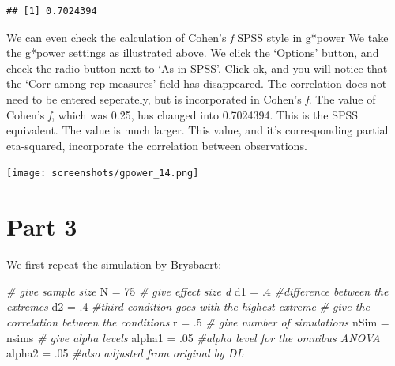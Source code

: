 \documentclass[
]{book}
\newenvironment{Shaded}{\begin{snugshade}}{\end{snugshade}}
\newcommand{\CommentTok}[1]{\textcolor[rgb]{0.56,0.35,0.01}{\textit{#1}}}
\newcommand{\DecValTok}[1]{\textcolor[rgb]{0.00,0.00,0.81}{#1}}
\newcommand{\NormalTok}[1]{#1}
\newcommand{\OtherTok}[1]{\textcolor[rgb]{0.56,0.35,0.01}{#1}}
\begin{document}
\begin{verbatim}
## [1] 0.7024394
\end{verbatim}

\newpage

We can even check the calculation of Cohen's \emph{f} SPSS style in g*power We take the g*power settings as illustrated above. We click the `Options' button, and check the radio button next to `As in SPSS'. Click ok, and you will notice that the `Corr among rep measures' field has disappeared. The correlation does not need to be entered seperately, but is incorporated in Cohen's \emph{f}. The value of Cohen's \emph{f}, which was 0.25, has changed into 0.7024394. This is the SPSS equivalent. The value is much larger. This value, and it's corresponding partial eta-squared, incorporate the correlation between observations.

\texttt{[image: screenshots/gpower\_14.png]}

\newpage

\hypertarget{part-3}{%
\section{Part 3}\label{part-3}}

We first repeat the simulation by Brysbaert:

\begin{Shaded}
\begin{Highlighting}[]
\CommentTok{\# give sample size}
\NormalTok{N }\OtherTok{=} \DecValTok{75}
\CommentTok{\# give effect size d}
\NormalTok{d1 }\OtherTok{=}\NormalTok{ .}\DecValTok{4} \CommentTok{\#difference between the extremes}
\NormalTok{d2 }\OtherTok{=}\NormalTok{ .}\DecValTok{4} \CommentTok{\#third condition goes with the highest extreme}
\CommentTok{\# give the correlation between the conditions}
\NormalTok{r }\OtherTok{=}\NormalTok{ .}\DecValTok{5}
\CommentTok{\# give number of simulations}
\NormalTok{nSim }\OtherTok{=}\NormalTok{ nsims}
\CommentTok{\# give alpha levels}
\NormalTok{alpha1 }\OtherTok{=}\NormalTok{ .}\DecValTok{05} \CommentTok{\#alpha level for the omnibus ANOVA}
\NormalTok{alpha2 }\OtherTok{=}\NormalTok{ .}\DecValTok{05} \CommentTok{\#also adjusted from original by DL}
\end{Highlighting}
\end{Shaded}
\end{document}
